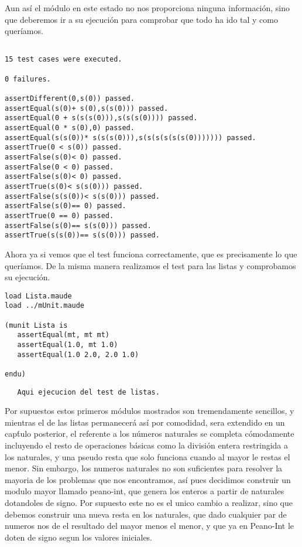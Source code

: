 Aun as\' i el m\'odulo en este estado no nos proporciona ninguna informaci\'on, sino que deberemos ir a su ejecuci\'on para comprobar que todo ha ido tal y como quer\'iamos. \par

\begin{verbatim}

15 test cases were executed.

0 failures.

assertDifferent(0,s(0)) passed.
assertEqual(s(0)+ s(0),s(s(0))) passed.
assertEqual(0 + s(s(s(0))),s(s(s(0)))) passed.
assertEqual(0 * s(0),0) passed.
assertEqual(s(s(0))* s(s(s(0))),s(s(s(s(s(s(0))))))) passed.
assertTrue(0 < s(0)) passed.
assertFalse(s(0)< 0) passed.
assertFalse(0 < 0) passed.
assertFalse(s(0)< 0) passed.
assertTrue(s(0)< s(s(0))) passed.
assertFalse(s(s(0))< s(s(0))) passed.
assertFalse(s(0)== 0) passed.
assertTrue(0 == 0) passed.
assertFalse(s(0)== s(s(0))) passed.
assertTrue(s(s(0))== s(s(0))) passed.
\end{verbatim}

Ahora ya si vemos que el test funciona correctamente, que es precisamente lo que quer\'iamos. De la misma manera realizamos el test para las listas y comprobamos su ejecuci\'on. \par

\begin{verbatim}
load Lista.maude
load ../mUnit.maude

(munit Lista is
   assertEqual(mt, mt mt)
   assertEqual(1.0, mt 1.0)
   assertEqual(1.0 2.0, 2.0 1.0)

endu)

\end{verbatim}

\begin{verbatim}
   Aqui ejecucion del test de listas.
\end{verbatim}

Por supuestos estos primeros m\'odulos mostrados son tremendamente sencillos, y mientras el de las listas permanecer\'a as\'i por comodidad, sera extendido en un cap\'tulo posterior, el referente a los n\'umeros naturales se completa c\'omodamente incluyendo el resto de operaciones b\'asicas como la divisi\'on entera restringida a los naturales, y una pseudo resta que solo funciona cuando al mayor le restas el menor. Sin embargo, los numeros naturales no son suficientes para resolver la mayoria de los problemas que nos encontramos, as\'i pues decidimos construir un modulo mayor llamado peano-int, que genera los enteros a partir de naturales dotandoles de signo. Por supuesto este no es el unico cambio a realizar, sino que debemos construir una nueva resta en los naturales, que dado cualquier par de numeros nos de el resultado del mayor menos el menor, y que ya en Peano-Int le doten de signo segun los valores iniciales. \\

